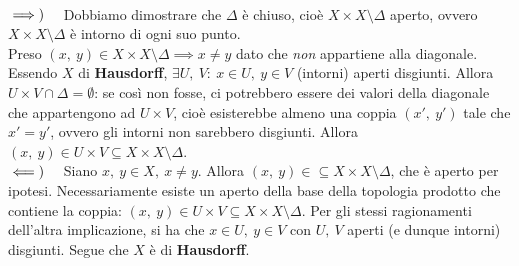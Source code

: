\begin{demonstration}~{}\\
$\implies)\quad$ Dobbiamo dimostrare che $\Delta$ è chiuso, cioè $X\times X\setminus \Delta$ aperto, ovvero $X\times X\setminus \Delta$ è intorno di ogni suo punto.\\
Preso $\left(x,\ y\right)\in X\times X\setminus \Delta\implies x\neq y$ dato che \textit{non} appartiene alla diagonale. Essendo $X$ di \textbf{Hausdorff}, $\exists U,\ V:\ x\in U,\ y\in V$ (intorni) aperti  disgiunti. Allora $U\times V\cap \Delta =\emptyset$: se così non fosse, ci potrebbero essere dei valori della diagonale che appartengono ad $U\times V$, cioè esisterebbe almeno una coppia $\left(x',\ y'\right)$ tale che $x'=y'$, ovvero gli intorni non sarebbero disgiunti. Allora $\left(x,\ y\right)\in U\times V\subseteq X\times X\setminus \Delta$.\\
$\impliedby)\quad$ Siano $x,\ y\in X,\ x\neq y$. Allora $\left(x,\ y\right)\in \subseteq X\times X\setminus \Delta$, che è aperto per ipotesi. Necessariamente esiste un aperto della base della topologia prodotto che contiene la coppia: $\left(x,\ y\right)\in U\times V\subseteq X\times X\setminus \Delta$. Per gli stessi ragionamenti dell'altra implicazione, si ha che $x\in U,\ y\in V$ con $U,\ V$ aperti (e dunque intorni) disgiunti. Segue che $X$ è di \textbf{Hausdorff}.
\end{demonstration}
